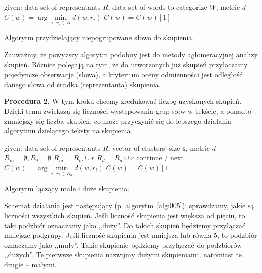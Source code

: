 \documentclass{praca1}
\begin{document}
\begin{algorithm}[h!]
\begin{algorithmic}[1]
		\State given: data set of representants $R$, data set of words to categorize $W$, metric $d$
            \State $C(w) = \arg \min\limits_{i:\ r_i \in R} d(w,r_i)$
            	\State $C(w) = C(w)[1]$
            \EndIf
       \EndFor
\end{algorithmic}
\caption{Algorytm przydzielający niepogrupowane słowo do skupienia.}\label{alg:004}
\end{algorithm}

Zauważmy, że powyższy algorytm podobny jest do metody aglomeracyjnej analizy skupień. Różnice polegają na tym, że do utworzonych już skupień przyłączamy pojedyncze obserwacje (słowa), a kryterium oceny odmienności jest odległość danego słowa od środka (reprezentanta) skupienia.

\textbf{Procedura 2.} W tym kroku chcemy zredukować liczbę uzyskanych skupień. Dzięki temu zwiększą się liczności występowania grup słów w tekście, a ponadto zmniejszy się liczba skupień, co może przyczynić się do lepszego działania algorytmu dzielącego teksty na skupienia.

\begin{algorithm}[h!]
\begin{algorithmic}[1]
		\State given: data set of representants $R$, vector of clusters' size $\mathbf{s}$, metric $d$
		\State $R_m = \emptyset, R_d = \emptyset$
				\State $R_m = R_m \cup r$
			\Else
				\State $R_d = R_d \cup r$
			\EndIf
		\EndFor
        		\State continue / next
        	\EndIf
            \State $C(w) = \arg\min\limits_{i:\ r_i \in R_d} d(w,r_i)$
            	\State $C(w) = C(w)[1]$
            \EndIf
       \EndFor
\end{algorithmic}
\caption{Algorytm łączący małe i duże skupienia.}\label{alg:005}
\end{algorithm}

Schemat działania jest następujący (p. algorytm~\ref{alg:005}): sprawdzamy, jakie są liczności wszystkich skupień. Jeśli liczność skupienia jest większa od pięciu, to taki podzbiór oznaczamy jako ,,duży''. Do takich skupień będziemy przyłączać mniejsze podgrupy. Jeśli liczność skupienia jest mniejsza lub równa $5$, to podzbiór oznaczamy jako ,,mały''. Takie skupienie będziemy przyłączać do podzbiorów ,,dużych''. Te pierwsze skupienia nazwijmy dużymi skupieniami, natomiast te drugie -- małymi. 
\end{document}
